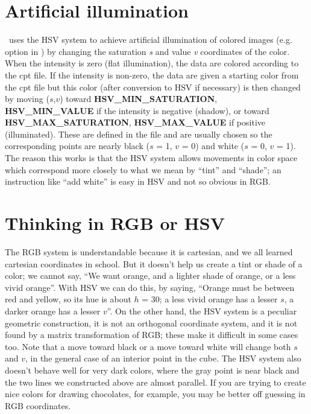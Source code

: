 \section{Artificial illumination}
\GMT\ uses the HSV system to
achieve artificial illumination of colored images (e.g. 
option in ) by changing the saturation \emph{s} and value \emph{v}
coordinates of the color.  When the intensity is zero (flat illumination), the data
are colored according to the cpt file.  If the intensity is
non-zero, the data are given a starting color from the cpt file
but this color (after conversion to HSV if necessary) is then
changed by moving ($s$,$v$) toward \textbf{HSV\_MIN\_SATURATION},
\textbf{HSV\_MIN\_VALUE} if the intensity is negative (shadow), or toward
\textbf{HSV\_MAX\_SATURATION}, \textbf{HSV\_MAX\_VALUE} if positive (illuminated).  These are
defined in the  file and are usually
chosen so the corresponding points are nearly black ($s$ = 1,
$v$ = 0) and white ($s$ = 0, $v$ = 1).
The reason this works is that the HSV system allows movements in
color space which correspond more closely to what we mean by
``tint'' and ``shade''; an instruction like ``add white'' is
easy in HSV and not so obvious in RGB.

\section{Thinking in RGB or HSV}
The RGB system is understandable because it is cartesian, and we all
learned cartesian coordinates in school.  But it doesn't help us
create a tint or shade of a color; we cannot say, ``We want orange,
and a lighter shade of orange, or a less vivid orange''.  With HSV we
can do this, by saying, ``Orange must be between red and yellow, so
its hue is about $h$ = 30\DS; a less vivid orange has a lesser
$s$, a darker orange has a lesser $v$''.  On the other hand,
the HSV system is a peculiar geometric construction, it is not an
orthogonal coordinate system, and it is not found by a matrix
transformation of RGB; these make it difficult in some cases too.
Note that a move toward black or a move toward white will change both
$s$ and $v$, in the general case of an interior point in the
cube. The HSV system also doesn't behave well for very dark colors,
where the gray point is near black and the two lines we constructed
above are almost parallel.  If you are trying to create nice colors
for drawing chocolates, for example, you may be better off guessing
in RGB coordinates.

